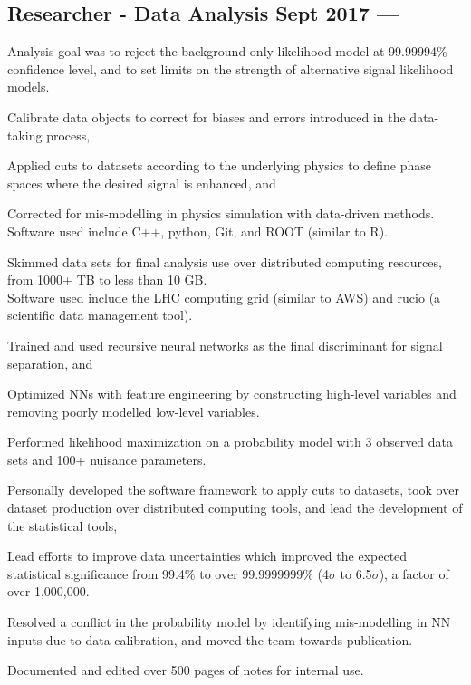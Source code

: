 \documentclass[letter,10pt]{article}
\begin{document}
\subsection{{Researcher - Data Analysis  \hfill Sept 2017 --- }}
\begin{zitemize}
\item Analysis goal was to reject the background only likelihood model at 99.99994\% confidence level, and to set limits on the strength of alternative signal likelihood models.
\item Calibrate data objects to correct for biases and errors introduced in the data-taking process,
\item Applied cuts to datasets according to the underlying physics to define phase spaces where the desired signal is enhanced, and
\item Corrected for mis-modelling in physics simulation with data-driven methods. \\
Software used include C++, python, Git, and ROOT (similar to R).
\item Skimmed data sets for final analysis use over distributed computing resources, from  1000+ TB to less than 10 GB. \\
Software used include the LHC computing grid (similar to AWS) and rucio (a scientific data management tool).
\item Trained and used recursive neural networks as the final discriminant for signal separation, and
\item Optimized NNs with feature engineering by constructing high-level variables and removing poorly modelled low-level variables.
\item Performed likelihood maximization on a probability model with 3 observed data sets and 100+ nuisance parameters.
\item Personally developed the software framework to apply cuts to datasets, took over dataset production over distributed computing tools, and lead the development of the statistical tools,
\item Lead efforts to improve data uncertainties which improved the expected statistical significance from 99.4\% to over 99.9999999\% (4$\sigma$ to 6.5$\sigma$), a factor of over 1,000,000.
\item Resolved a conflict in the probability model by identifying mis-modelling in NN inputs due to data calibration, and moved the team towards publication.
\item Documented and edited over 500 pages of notes for internal use.
\end{zitemize}
\end{document}
